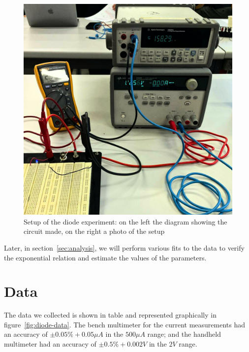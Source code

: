 \begin{figure}[ht]
    \centering
    \includegraphics[width=.45\textwidth]{figures/setup.png}
    \caption{Setup of the diode experiment: on the left the diagram showing
    the circuit made, on the right a photo of the setup}\label{fig:setup-diode}
\end{figure}

Later, in section~\ref{sec:analysis}, we will perform various fits to the data to
verify the exponential relation and estimate the values of the parameters.

\section{Data}\label{sec:data}
The data we collected is shown in table and represented graphically in
figure~\ref{fig:diode-data}. The bench multimeter for the current measurements
had an accuracy of \(\pm 0.05\% + 0.05\mu A\) in the \(500 \mu A\) range; and
the handheld multimeter had an accuracy of \(\pm 0.5\% + 0.002V\) in the \(2 V\)
range.


